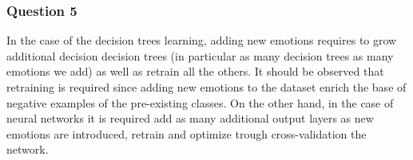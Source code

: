 \documentclass{article}
\begin{document}
\subsubsection*{Question 5}
In the case of the decision trees learning, adding new emotions requires to grow additional decision decision trees (in particular as many decision trees as many emotions we add) as well as retrain all the others. It should be observed that retraining is required since adding new emotions to the dataset enrich the base of negative examples of the pre-existing classes. On the other hand, in the case of neural networks it is required add as many additional output layers as new emotions are introduced, retrain  and optimize trough cross-validation the network.

%
%
\end{document}
